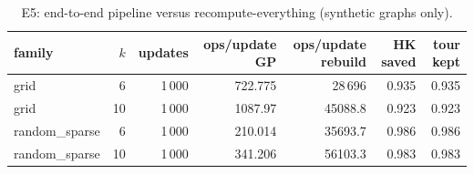 \begin{table}[t]
\centering
\caption{E5: end-to-end pipeline versus recompute-everything (synthetic graphs only).}
\label{tab:e5}
\small
\begin{tabular}{lrrrrrr}
\hline
family & $k$ & updates & ops/update GP & ops/update rebuild & HK saved & tour kept \\
\hline
grid & 6 & 1\,000 & 722.775 & 28\,696 & 0.935 & 0.935 \\
grid & 10 & 1\,000 & 1087.97 & 45088.8 & 0.923 & 0.923 \\
random\_sparse & 6 & 1\,000 & 210.014 & 35693.7 & 0.986 & 0.986 \\
random\_sparse & 10 & 1\,000 & 341.206 & 56103.3 & 0.983 & 0.983 \\
\hline
\end{tabular}
\end{table}
